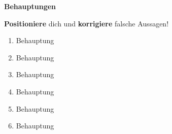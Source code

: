 \documentclass[a4paper,12pt]{article}
\begin{document}
{\huge{\textbf{Behauptungen}}} \\

{\large{
    \textbf{Positioniere} dich und \textbf{korrigiere} falsche Aussagen!
    \begin{enumerate}


    \item Behauptung
    \item Behauptung
    \item Behauptung
    \item Behauptung
    \item Behauptung
    \item Behauptung


    \end{enumerate}


}}
\end{document}
